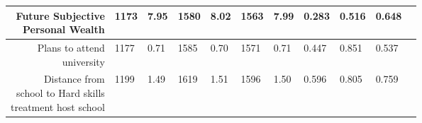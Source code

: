 \begin{longtable}{|r|l|l|l|l|l|l|l|l|l|l}
\hline

	 \makecell{Future Subjective\\Personal Wealth}                                  & 1173                                                               &  7.95                                                              & 1580                                                               &  8.02                                                              & 1563                                                               &  7.99                                                              & 0.283                                                              & 0.516                                                              & 0.648                                                             \\

\hline

	 \makecell{Plans to attend \\university}                                         & 1177                                                               &  0.71                                                              & 1585                                                               &  0.70                                                              & 1571                                                               &  0.71                                                              & 0.447                                                              & 0.851                                                              & 0.537                                                             \\

\hline

	 \makecell{Distance from\\ school to Hard skills\\ treatment host school}          & 1199                                                               &  1.49                                                              & 1619                                                               &  1.51                                                              & 1596                                                               &  1.50                                                              & 0.596                                                              & 0.805                                                              & 0.759                                                             \\


\end{longtable}

